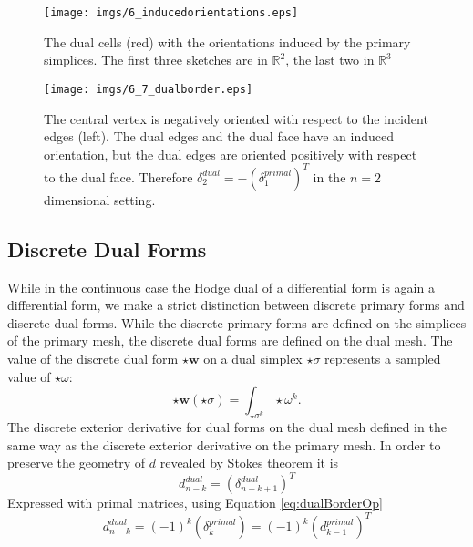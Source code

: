 \begin{figure}%
\texttt{[image: imgs/6\_inducedorientations.eps]}
\caption{The dual cells (red) with the orientations induced by the primary simplices. The first three sketches are in $\mathbb R^2$, the last two in $\mathbb R^3$}%
\label{fig:6_inducedorientations}%
\end{figure}

\begin{figure}%
\begin{center}
\texttt{[image: imgs/6\_7\_dualborder.eps]}%
\end{center}
\caption{The central vertex is negatively oriented with respect to the incident edges (left). The dual edges and the dual face have an induced orientation, but the dual edges are oriented positively with respect to the dual face. Therefore $\delta_{2}^{dual} = - (\delta_1^{primal})^T$ in the $n=2$ dimensional setting.}%
\label{fig:6_dualborder}%
\end{figure}

\subsection{Discrete Dual Forms}
While in the continuous case the Hodge dual of a differential form is again a differential form, we make a strict distinction between discrete primary forms and discrete dual forms. While the discrete primary forms are defined on the simplices of the primary mesh, the discrete dual forms are defined on the dual mesh.
The value of the discrete dual form $\star \textbf{w}$ on a dual simplex $\star \sigma$ represents a sampled value of $\star \omega$:
\begin{equation}\star \textbf{w}(\star \sigma) = \int_{\star \sigma^k}  \star \omega^k. \label{eq:dualSampling}\end{equation}
The discrete exterior derivative for dual forms on the dual mesh defined in the same way as the discrete exterior derivative on the primary mesh. In order to preserve the geometry of $d$ revealed by Stokes theorem it is
\[d^{dual}_{n-k} = (\delta^{dual}_{n-k+1})^T \]
Expressed with primal matrices, using Equation \ref{eq:dualBorderOp}
\begin{equation}d^{dual}_{n-k}= (-1)^k(\delta_k^{primal}) = (-1)^k(d^{primal}_{k-1})^T \label{eq:dualDerivative}\end{equation}


